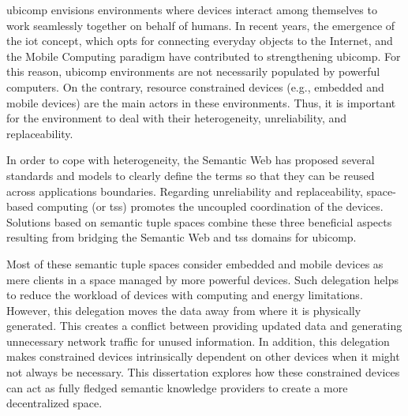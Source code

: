 




\begin{abstracts}        %
\acf{ubicomp} envisions environments where devices interact among themselves to work seamlessly together on behalf of humans.
In recent years, the emergence of the \acf{iot} concept, which opts for connecting everyday objects to the Internet, and the Mobile Computing paradigm have contributed to strengthening \ac{ubicomp}.
For this reason, \ac{ubicomp} environments are not necessarily populated by powerful computers.
On the contrary, resource constrained devices (e.g., embedded and mobile devices) are the main actors in these environments.
Thus, it is important for the environment to deal with their heterogeneity, unreliability, and replaceability.


In order to cope with heterogeneity, the Semantic Web has proposed several standards and models to clearly define the terms so that they can be reused across applications boundaries.
Regarding unreliability and replaceability, space-based computing (or \aclp{ts}) promotes the uncoupled coordination of the devices.
Solutions based on semantic tuple spaces combine these three beneficial aspects resulting from bridging the Semantic Web and \aclp{ts} domains for \ac{ubicomp}.

Most of these semantic tuple spaces consider embedded and mobile devices as mere clients in a space managed by more powerful devices.
Such delegation helps to reduce the workload of devices with computing and energy limitations.
However,  this delegation moves the data away from where it is physically generated.
This creates a conflict between providing updated data and generating unnecessary network traffic for unused information.
In addition, this delegation makes constrained devices intrinsically dependent on other devices when it might not always be necessary.
This dissertation explores how these constrained devices can act as fully fledged semantic knowledge providers to create a more decentralized space.


\end{abstracts}
